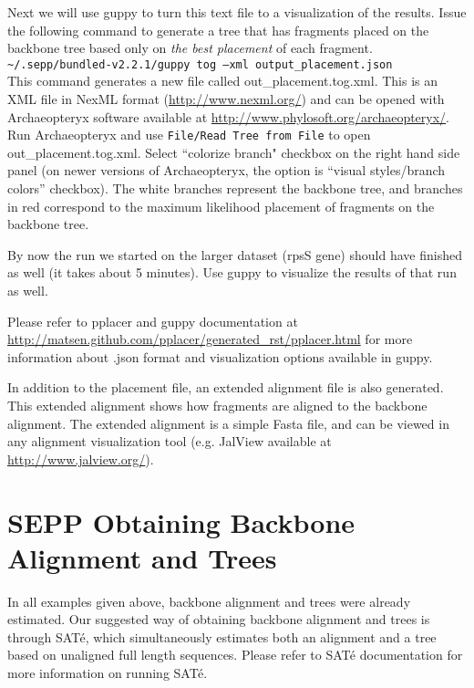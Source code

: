 \documentclass[11pt]{article} %
\newcommand{\sepp}{SEPP\xspace}
\newcommand{\ins}[1]{{\tt #1}}
\newcommand{\file}[1]{{\sf #1}}
\newcommand{\sate}{SAT\'{e}\xspace}
\newcommand{\pplacer}{pplacer\xspace}
\newcommand{\guppy}{guppy\xspace}
\newcommand{\arch}{Archaeopteryx\xspace}
\newcommand{\sbun}{\textasciitilde/.sepp/bundled-v2.2.1}
\begin{document}
Next we will use \guppy to turn this text file to a visualization of the results. Issue the following command to generate a tree that has fragments placed on the backbone tree based only on {\em the best placement} of each fragment.\\

\ins{\sbun/guppy tog --xml output\_placement.json}\\

This command generates a new file called \file{out\_placement.tog.xml}. This is an XML file in NexML format (\url{http://www.nexml.org/}) and can be opened with \arch software {available at \url{http://www.phylosoft.org/archaeopteryx/}}. 
Run \arch and use \ins{File/Read Tree from File} to open \file{out\_placement.tog.xml}. Select ``colorize branch" checkbox on the right hand side panel (on newer versions of \arch, the option is ``visual styles/branch colors'' checkbox). The white branches represent the backbone tree, and branches in red correspond to the maximum likelihood placement of fragments on the backbone tree. 

By now the run we started on the larger dataset (rpsS gene) should have finished as well (it takes about 5 minutes). Use \guppy to visualize the results of that run as well. 

Please refer to \pplacer and \guppy documentation at \url{http://matsen.github.com/pplacer/generated_rst/pplacer.html} for more information about \file{.json} format and visualization options available in \guppy. 

In addition to the placement file, an extended alignment file is also generated. This extended alignment shows how fragments are aligned to the backbone alignment. The extended alignment is a simple Fasta file, and can be viewed in any alignment visualization tool (e.g. JalView available at \url{http://www.jalview.org/}). 


\section{\sepp Obtaining Backbone Alignment and Trees}
In all examples given above, backbone alignment and trees were already estimated.
Our suggested way of obtaining backbone alignment and trees is through \sate \cite{sate2},
which simultaneously estimates both an alignment and a tree based on unaligned full length sequences.
Please refer to \sate documentation for more information on running \sate. 
\end{document}
